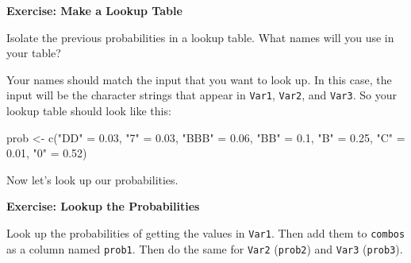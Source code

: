 \documentclass[
  letterpaper,
  DIV=11,
  numbers=noendperiod]{scrbook}
\newenvironment{Shaded}{\begin{snugshade}}{\end{snugshade}}
\newcommand{\FloatTok}[1]{\textcolor[rgb]{0.68,0.00,0.00}{#1}}
\newcommand{\FunctionTok}[1]{\textcolor[rgb]{0.28,0.35,0.67}{#1}}
\newcommand{\NormalTok}[1]{\textcolor[rgb]{0.00,0.23,0.31}{#1}}
\newcommand{\OtherTok}[1]{\textcolor[rgb]{0.00,0.23,0.31}{#1}}
\newcommand{\StringTok}[1]{\textcolor[rgb]{0.13,0.47,0.30}{#1}}
\begin{document}
\begin{tcolorbox}[enhanced jigsaw, left=2mm, breakable, colback=white, colframe=quarto-callout-color-frame, leftrule=.75mm, bottomrule=.15mm, arc=.35mm, opacityback=0, rightrule=.15mm, toprule=.15mm]

\vspace{-3mm}\textbf{Exercise: Make a Lookup Table}\vspace{3mm}

Isolate the previous probabilities in a lookup table. What names will
you use in your table?

\end{tcolorbox}

Your names should match the input that you want to look up. In this
case, the input will be the character strings that appear in
\texttt{Var1}, \texttt{Var2}, and \texttt{Var3}. So your lookup table
should look like this:

\begin{Shaded}
\begin{Highlighting}[]
\NormalTok{prob }\OtherTok{\textless{}{-}} \FunctionTok{c}\NormalTok{(}\StringTok{"DD"} \OtherTok{=} \FloatTok{0.03}\NormalTok{, }\StringTok{"7"} \OtherTok{=} \FloatTok{0.03}\NormalTok{, }\StringTok{"BBB"} \OtherTok{=} \FloatTok{0.06}\NormalTok{, }
  \StringTok{"BB"} \OtherTok{=} \FloatTok{0.1}\NormalTok{, }\StringTok{"B"} \OtherTok{=} \FloatTok{0.25}\NormalTok{, }\StringTok{"C"} \OtherTok{=} \FloatTok{0.01}\NormalTok{, }\StringTok{"0"} \OtherTok{=} \FloatTok{0.52}\NormalTok{)}
\end{Highlighting}
\end{Shaded}

Now let's look up our probabilities.

\begin{tcolorbox}[enhanced jigsaw, left=2mm, breakable, colback=white, colframe=quarto-callout-color-frame, leftrule=.75mm, bottomrule=.15mm, arc=.35mm, opacityback=0, rightrule=.15mm, toprule=.15mm]

\vspace{-3mm}\textbf{Exercise: Lookup the Probabilities}\vspace{3mm}

Look up the probabilities of getting the values in \texttt{Var1}. Then
add them to \texttt{combos} as a column named \texttt{prob1}. Then do
the same for \texttt{Var2} (\texttt{prob2}) and \texttt{Var3}
(\texttt{prob3}).

\end{tcolorbox}
\end{document}
